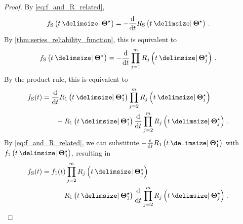 \documentclass[
    11pt,
    extrafontsizes,
    article,
    oldfontcommands,
    final,
    oneside,
    openany,
    hidelinks]{memoir}
\begin{document}
\begin{proof}
By \cref{eq:f_and_R_related},
\begin{equation}
    \spdf\left(t \Given \tparam\sysparam\right) = -\derivative{t} \srv_{\sv}\left(t \Given \tparam\sysparam\right)\,.
\end{equation}
By \cref{thm:series_reliability_function}, this is equivalent to
\begin{equation}
    \spdf\left(t \Given \tparam\sysparam\right) = -\derivative{t} \prod_{j=1}^{m} \srv_j\left(t \Given \tparam{\sysparam}_j\right)\,.
\end{equation}
By the product rule, this is equivalent to
\begin{equation}
\begin{split}
    \spdf(t) &= \derivative{t} \srv_1\left(t\Given \tparam{\sysparam}_1\right) \prod_{j=2}^{m} \srv_j\left(t \Given \tparam{\sysparam}_j\right)\\
    & \qquad - \srv_1\left(t \Given \tparam{\sysparam}_1\right) \derivative{t} \prod_{j=2}^{m} \srv_j\left(t \Given \tparam{\sysparam}_j\right)\,.
\end{split}
\end{equation}
By \cref{eq:f_and_R_related}, we can substitute $-\derivative{t} \srv_1\left(t \Given \tparam{\sysparam}_1\right)$ with $\pdf_1\left(t \Given \tparam{\sysparam}_1\right)$, resulting in
\begin{equation}
\begin{split}
    \spdf(t) &= \pdf_1(t) \prod_{j=2}^{m} \srv_j\left(t \Given \tparam{\sysparam}_j\right)\\
    & \qquad - \srv_1\left(t \Given \tparam{\sysparam}_1\right) \derivative{t} \prod_{j=2}^{m} \srv_j\left(t \Given \tparam{\sysparam}_j\right)\,.
\end{split}
\end{equation}


\end{proof}
\end{document}
